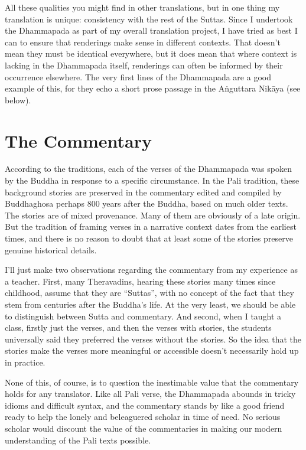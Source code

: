 \documentclass[12pt,openany]{book}%
\begin{document}
All these qualities you might find in other translations, but in one thing my translation is unique: consistency with the rest of the Suttas. Since I undertook the Dhammapada as part of my overall translation project, I have tried as best I can to ensure that renderings make sense in different contexts. That doesn’t mean they must be identical everywhere, but it does mean that where context is lacking in the Dhammapada itself, renderings can often be informed by their occurrence elsewhere. The very first lines of the Dhammapada are a good example of this, for they echo a short prose passage in the \textsanskrit{Aṅguttara} \textsanskrit{Nikāya} (see below).

\section*{The Commentary}

According to the traditions, each of the verses of the Dhammapada was spoken by the Buddha in response to a specific circumstance. In the Pali tradition, these background stories are preserved in the commentary edited and compiled by Buddhaghosa perhaps 800 years after the Buddha, based on much older texts. The stories are of mixed provenance. Many of them are obviously of a late origin. But the tradition of framing verses in a narrative context dates from the earliest times, and there is no reason to doubt that at least some of the stories preserve genuine historical details.

I’ll just make two observations regarding the commentary from my experience as a teacher. First, many Theravadins, hearing these stories many times since childhood, assume that they are “Suttas”, with no concept of the fact that they stem from centuries after the Buddha’s life. At the very least, we should be able to distinguish between Sutta and commentary. And second, when I taught a class, firstly just the verses, and then the verses with stories, the students universally said they preferred the verses without the stories. So the idea that the stories make the verses more meaningful or accessible doesn’t necessarily hold up in practice.

None of this, of course, is to question the inestimable value that the commentary holds for any translator. Like all Pali verse, the Dhammapada abounds in tricky idioms and difficult syntax, and the commentary stands by like a good friend ready to help the lonely and beleaguered scholar in time of need. No serious scholar would discount the value of the commentaries in making our modern understanding of the Pali texts possible.
\end{document}
